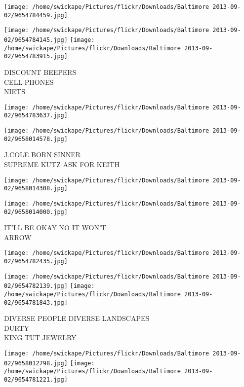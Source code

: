 \documentclass[10pt,letterpaper]{article}
\begin{document}
\texttt{[image: /home/swickape/Pictures/flickr/Downloads/Baltimore 2013-09-02/9654784459.jpg]}

\vspace{0.25in}
\texttt{[image: /home/swickape/Pictures/flickr/Downloads/Baltimore 2013-09-02/9654784145.jpg]}
\texttt{[image: /home/swickape/Pictures/flickr/Downloads/Baltimore 2013-09-02/9654783915.jpg]}

DISCOUNT BEEPERS\\
CELL{-}PHONES\\
NIETS\\
\pagebreak

\texttt{[image: /home/swickape/Pictures/flickr/Downloads/Baltimore 2013-09-02/9654783637.jpg]}

\vspace{0.25in}
\texttt{[image: /home/swickape/Pictures/flickr/Downloads/Baltimore 2013-09-02/9658014578.jpg]}

J.COLE BORN SINNER\\
SUPREME KUTZ ASK FOR KEITH\\
\pagebreak

\texttt{[image: /home/swickape/Pictures/flickr/Downloads/Baltimore 2013-09-02/9658014308.jpg]}

\vspace{0.25in}
\texttt{[image: /home/swickape/Pictures/flickr/Downloads/Baltimore 2013-09-02/9658014000.jpg]}

IT'LL BE OKAY NO IT WON'T\\
ARROW\\
\pagebreak

\texttt{[image: /home/swickape/Pictures/flickr/Downloads/Baltimore 2013-09-02/9654782435.jpg]}

\vspace{0.25in}
\texttt{[image: /home/swickape/Pictures/flickr/Downloads/Baltimore 2013-09-02/9654782139.jpg]}
\texttt{[image: /home/swickape/Pictures/flickr/Downloads/Baltimore 2013-09-02/9654781843.jpg]}

DIVERSE PEOPLE DIVERSE LANDSCAPES\\
DURTY\\
KING TUT JEWELRY\\
\pagebreak

\texttt{[image: /home/swickape/Pictures/flickr/Downloads/Baltimore 2013-09-02/9658012798.jpg]}
\texttt{[image: /home/swickape/Pictures/flickr/Downloads/Baltimore 2013-09-02/9654781221.jpg]}
\end{document}
